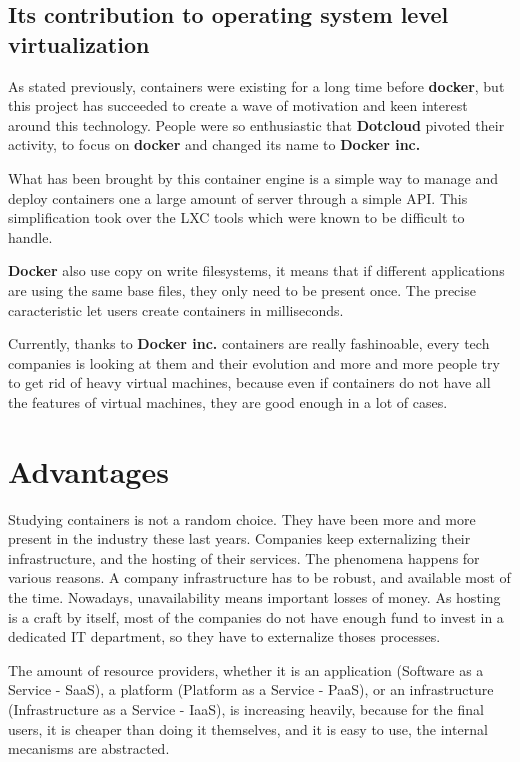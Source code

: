 \subsection{Its contribution to operating system level virtualization}

As stated previously, containers were existing for a long time before
\textbf{docker}, but this project has succeeded to create a wave of motivation
and keen interest around this technology. People were so enthusiastic that
\textbf{Dotcloud} pivoted their activity, to focus on \textbf{docker} and
changed its name to \textbf{Docker inc.}

What has been brought by this container engine is a simple way to manage and
deploy containers one a large amount of server through a simple API. This
simplification took over the LXC tools which were known to be difficult to
handle.

\textbf{Docker} also use copy on write filesystems, it means that if different
applications are using the same base files, they only need to be present once.
The precise caracteristic let users create containers in milliseconds.

Currently, thanks to \textbf{Docker inc.} containers are really fashinoable,
every tech companies is looking at them and their evolution and more and more
people try to get rid of heavy virtual machines, because even if containers do
not have all the features of virtual machines, they are good enough in a lot of
cases.

\section{Advantages}

Studying containers is not a random choice. They have been more and more
present in the industry these last years. Companies keep externalizing their
infrastructure, and the hosting of their services. The phenomena happens for
various reasons. A company infrastructure has to be robust, and available most
of the time. Nowadays, unavailability means important losses of money. As
hosting is a craft by itself, most of the companies do not have enough fund to
invest in a dedicated IT department, so they have to externalize thoses
processes.

The amount of resource providers, whether it is an application (Software as a
Service - SaaS), a platform (Platform as a Service - PaaS), or an
infrastructure (Infrastructure as a Service - IaaS), is increasing heavily,
because for the final users, it is cheaper than doing it themselves, and it is
easy to use, the internal mecanisms are abstracted.


